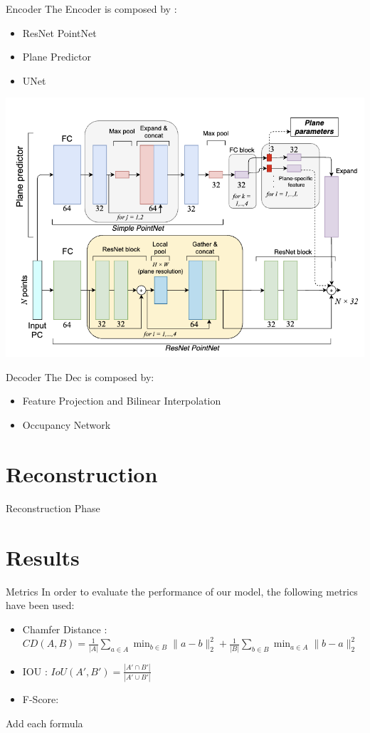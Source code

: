 \documentclass{beamer}
\begin{document}
\begin{frame}{Encoder}
The Encoder is composed by :
\begin{itemize}
\item ResNet PointNet
\item Plane Predictor 
\item UNet
\end{itemize}
\includegraphics[width=\textwidth]{../media/encoder.png}
\end{frame}

\begin{frame}{Decoder}
The Dec is composed by:
\begin{itemize}
\item Feature Projection and Bilinear Interpolation
\item Occupancy Network
\end{itemize}
\end{frame}

\section{Reconstruction}

\begin{frame}{Reconstruction Phase}
\end{frame}

\section{Results}

\begin{frame}{Metrics}
In order to evaluate the performance of our model, the following metrics have been used:
\begin{itemize}
\item Chamfer Distance : \\ 
$
CD(A, B) = \frac{1}{|A|} \sum_{a \in A} \min_{b \in B} \|a - b\|_2^2 + \frac{1}{|B|} \sum_{b \in B} \min_{a \in A} \|b - a\|_2^2
$
\item IOU : 
$ IoU(A', B') = \frac{|A' \cap B'|}{|A' \cup B'|}$
\item F-Score:
\end{itemize}
Add each formula
\end{frame}
\end{document}
